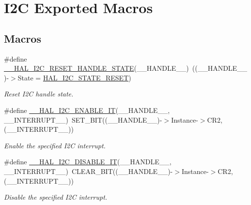 \hypertarget{group___i2_c___exported___macros}{\section{I2\-C Exported Macros}
\label{group___i2_c___exported___macros}
}
\subsection*{Macros}
\begin{DoxyCompactItemize}
\item 
\#define \hyperlink{group___i2_c___exported___macros_ga74c8fd72a78882720c28448ce8bd33d8}{\-\_\-\-\_\-\-H\-A\-L\-\_\-\-I2\-C\-\_\-\-R\-E\-S\-E\-T\-\_\-\-H\-A\-N\-D\-L\-E\-\_\-\-S\-T\-A\-T\-E}(\-\_\-\-\_\-\-H\-A\-N\-D\-L\-E\-\_\-\-\_\-)~((\-\_\-\-\_\-\-H\-A\-N\-D\-L\-E\-\_\-\-\_\-)-\/$>$State = \hyperlink{group___h_a_l__state__structure__definition_ggaef355af8eab251ae2a19ee164ad81c37a91ba08634e08d7287940f1bc5a37eeff}{H\-A\-L\-\_\-\-I2\-C\-\_\-\-S\-T\-A\-T\-E\-\_\-\-R\-E\-S\-E\-T})
\begin{DoxyCompactList}\small\item\em Reset I2\-C handle state. \end{DoxyCompactList}\item 
\#define \hyperlink{group___i2_c___exported___macros_gac9d8b249b06b2d30f987acc9ceebd1d9}{\-\_\-\-\_\-\-H\-A\-L\-\_\-\-I2\-C\-\_\-\-E\-N\-A\-B\-L\-E\-\_\-\-I\-T}(\-\_\-\-\_\-\-H\-A\-N\-D\-L\-E\-\_\-\-\_\-, \-\_\-\-\_\-\-I\-N\-T\-E\-R\-R\-U\-P\-T\-\_\-\-\_\-)~S\-E\-T\-\_\-\-B\-I\-T((\-\_\-\-\_\-\-H\-A\-N\-D\-L\-E\-\_\-\-\_\-)-\/$>$Instance-\/$>$C\-R2,(\-\_\-\-\_\-\-I\-N\-T\-E\-R\-R\-U\-P\-T\-\_\-\-\_\-))
\begin{DoxyCompactList}\small\item\em Enable the specified I2\-C interrupt. \end{DoxyCompactList}\item 
\#define \hyperlink{group___i2_c___exported___macros_ga33d0c7202ae298fa3ae128c5da49d455}{\-\_\-\-\_\-\-H\-A\-L\-\_\-\-I2\-C\-\_\-\-D\-I\-S\-A\-B\-L\-E\-\_\-\-I\-T}(\-\_\-\-\_\-\-H\-A\-N\-D\-L\-E\-\_\-\-\_\-, \-\_\-\-\_\-\-I\-N\-T\-E\-R\-R\-U\-P\-T\-\_\-\-\_\-)~C\-L\-E\-A\-R\-\_\-\-B\-I\-T((\-\_\-\-\_\-\-H\-A\-N\-D\-L\-E\-\_\-\-\_\-)-\/$>$Instance-\/$>$C\-R2, (\-\_\-\-\_\-\-I\-N\-T\-E\-R\-R\-U\-P\-T\-\_\-\-\_\-))
\begin{DoxyCompactList}\small\item\em Disable the specified I2\-C interrupt. \end{DoxyCompactList}\item 

\end{DoxyCompactItemize}
